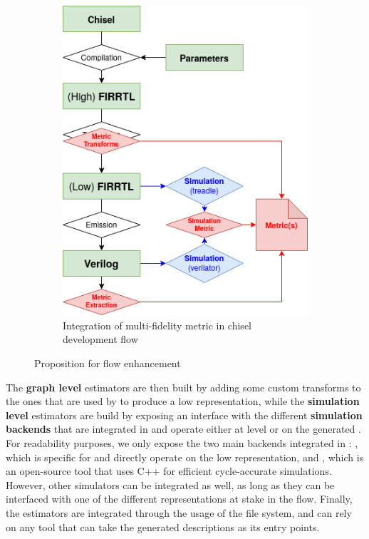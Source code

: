 \begin{figure}[h!]
\begin{subfigure}{0.49\textwidth}
                \includegraphics[width=1.0\textwidth]{Figures/chisel-flow-proposed.png}
                \caption{Integration of multi-fidelity metric in chisel development flow}
                \label{ch.estimators:sec.integration:ssec.multi-fidelity:fig.flow:sfig.proposed}
            \end{subfigure}
            \caption{Proposition for \chiselT{} flow enhancement}
            \label{ch.estimators:sec.integration:ssec.multi-fidelity:fig.flow}
            \vspace{-0.2cm}
        \end{figure}

        The {\bf graph level} estimators are then built by adding some custom transforms to the ones that are used by \chisel{} to produce a low \firrtl{} representation, while the {\bf simulation level} estimators are build by exposing an interface with the different {\bf simulation backends} that are integrated in \chisel{} and operate either at \firrtl{} level or on the generated \verilog.
        For readability purposes, we only expose the two main backends integrated in \chisel: \treadle{}, which is specific for \chisel{} and directly operate on the low \firrtl{} representation, and \verilator, which is an open-source tool that uses C++ for efficient cycle-accurate simulations.
        However, other simulators can be integrated as well, as long as they can be interfaced with one of the different representations at stake in the flow.
        Finally, the  estimators are integrated through the usage of the file system, and can rely on any tool that can take the generated \verilog{} descriptions as its entry points.

